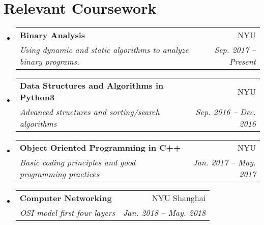 \documentclass[letterpaper,10pt]{article}
\makeatletter
\newcommand{\resumeSubheading}[4]{
  \item\begin{tabular*}{0.97\textwidth}{l@{\extracolsep{\fill}}r}
      \large\textbf{#1} & #2 \\
      \textit{\small#3} & \textit{\small #4} \\
    \end{tabular*}\vspace{-5pt}
}
\newcommand{\resumeSubHeadingListStart}{\begin{itemize}[leftmargin=*]}
\newcommand{\resumeSubHeadingListEnd}{\end{itemize}}
\makeatother
\begin{document}
\section{Relevant Coursework}
  \resumeSubHeadingListStart
    \resumeSubheading
      {Binary Analysis}{NYU}
      {Using dynamic and static algorithms to analyze binary programs.}{Sep. 2017 -- Present}
    \resumeSubheading
      {Data Structures and Algorithms in Python3}{NYU}
      {Advanced structures and sorting/search algorithms}{Sep. 2016 -- Dec. 2016}
    \resumeSubheading
      {Object Oriented Programming in C++}{NYU}
      {Basic coding principles and good programming practices}{Jan. 2017 -- May. 2017}
    \resumeSubheading
      {Computer Networking}{NYU Shanghai}
      {OSI model first four layers}{Jan. 2018 -- May. 2018}
  \resumeSubHeadingListEnd
\end{document}

